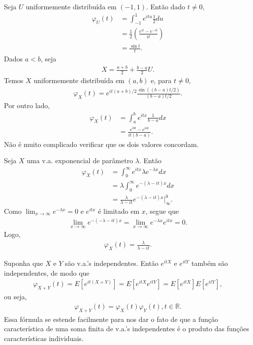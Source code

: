 \documentclass[../Notas.tex]{subfiles}
\begin{document}
\begin{example}
    Seja $U$ uniformemente distribuída em $(-1,1)$. Então dado $t\neq 0$,
    \begin{align*}
        \varphi_U(t) &= \int_{-1}^{1} e^{itu}\frac{1}{2} du \\
        &= \frac{1}{2}\left( \frac{e^{it} - e^{-it}}{it} \right) \\
        &= \frac{\sin t}{t}.
    \end{align*}
    Dados $a<b$, seja
    \begin{align*}
        X = \frac{a+b}{2} + \frac{b-a}{2}U.
    \end{align*}
    Temos $X$ uniformemente distribuída em $(a,b)$ e, para $t\neq 0$,
    \begin{align*}
        \varphi_X(t) = e^{it(a+b)/2}\frac{ \sin((b-a)t/2) }{(b-a)t/2}.
    \end{align*}
    Por outro lado,
    \begin{align*}
        \varphi_X(t) &= \int_{a}^{b} e^{itx}\frac{1}{b-a}dx \\
        &= \frac{e^{ibt} - e^{iat}}{it(b-a)}.
    \end{align*}
    Não é muito complicado verificar que os dois valores concordam.
\end{example}

\begin{example}
    Seja $X$ uma v.a. exponencial de parâmetro $\lambda$. Então
    \begin{align*}
        \varphi_X(t) &= \int_{0}^{\infty} e^{itx}\lambda e^{-\lambda x} dx \\
        &= \lambda\int_{0}^{\infty} e^{-(\lambda - it)x} dx \\
        &= \frac{\lambda}{\lambda - it}e^{-(\lambda-it)x}\Big|_{\infty}^0.
    \end{align*}
    Como $\displaystyle{ \lim_{x\to\infty} e^{-\lambda x} = 0 }$ e $e^{itx}$ é limitado em $x$, segue que
    \begin{align*}
        \lim_{x\to\infty} e^{-(-\lambda -it)x} = \lim_{x\to\infty} e^{-\lambda x}e^{itx} = 0.
    \end{align*}
    Logo,
    \begin{align*}
        \varphi_X(t) = \frac{\lambda}{\lambda - it}.
    \end{align*}
\end{example}
Suponha que $X$ e $Y$ são v.a.'s independentes. Então $e^{itX}$ e $e^{itY}$ também são independentes, de modo que
\begin{align*}
    \varphi_{X+Y}(t) = E[e^{it(X+Y)}] = E[e^{itX}e^{itY}] = E[e^{itX}]E[e^{itY}],
\end{align*}
ou seja,
\begin{align*}
    \varphi_{X+Y}(t) = \varphi_X(t)\varphi_Y(t), t\in\mathbb{R}.
\end{align*}
Essa fórmula se estende facilmente para nos dar o fato de que a função característica de uma soma finita de v.a.'s independentes é o produto das funções características individuais.
\end{document}

